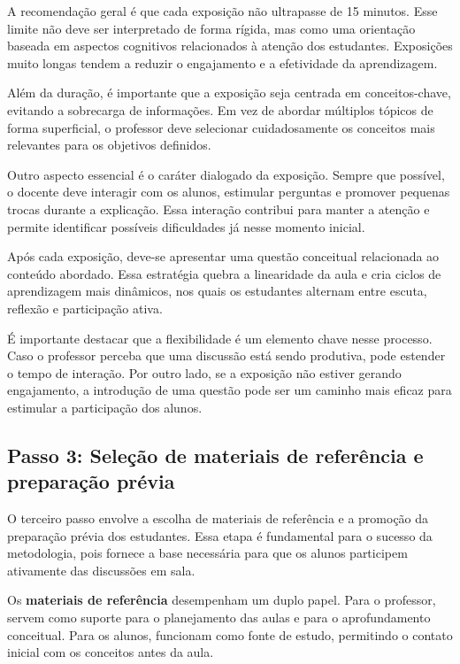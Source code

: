 A recomendação geral é que cada exposição não ultrapasse de 15 minutos. Esse limite não deve ser interpretado de forma rígida, mas como uma orientação baseada em aspectos cognitivos relacionados à atenção dos estudantes. Exposições muito longas tendem a reduzir o engajamento e a efetividade da aprendizagem.

Além da duração, é importante que a exposição seja centrada em conceitos-chave, evitando a sobrecarga de informações. Em vez de abordar múltiplos tópicos de forma superficial, o professor deve selecionar cuidadosamente os conceitos mais relevantes para os objetivos definidos.

Outro aspecto essencial é o caráter dialogado da exposição. Sempre que possível, o docente deve interagir com os alunos, estimular perguntas e promover pequenas trocas durante a explicação. Essa interação contribui para manter a atenção e permite identificar possíveis dificuldades já nesse momento inicial.

Após cada exposição, deve-se apresentar uma questão conceitual relacionada ao conteúdo abordado. Essa estratégia quebra a linearidade da aula e cria ciclos de aprendizagem mais dinâmicos, nos quais os estudantes alternam entre escuta, reflexão e participação ativa.

É importante destacar que a flexibilidade é um elemento chave nesse processo. Caso o professor perceba que uma discussão está sendo produtiva, pode estender o tempo de interação. Por outro lado, se a exposição não estiver gerando engajamento, a introdução de uma questão pode ser um caminho mais eficaz para estimular a participação dos alunos.

\subsection{Passo 3: Seleção de materiais de referência e preparação prévia}

O terceiro passo envolve a escolha de materiais de referência e a promoção da preparação prévia dos estudantes. Essa etapa é fundamental para o sucesso da metodologia, pois fornece a base necessária para que os alunos participem ativamente das discussões em sala.

Os {\bf materiais de referência} desempenham um duplo papel. Para o professor, servem como suporte para o planejamento das aulas e para o aprofundamento conceitual. Para os alunos, funcionam como fonte de estudo, permitindo o contato inicial com os conceitos antes da aula.


